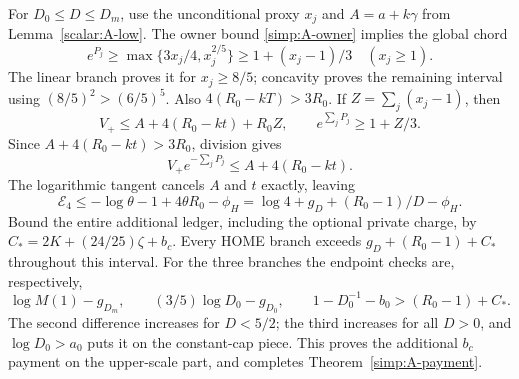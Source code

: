 For $D_0\le D\le D_m$, use the unconditional proxy
$x_j$ and $A=a+k\gamma$ from Lemma~\ref{scalar:A-low}.
The owner bound \eqref{simp:A-owner} implies the global chord
\[
 e^{P_j}\ge\max\{3x_j/4,x_j^{2/5}\}
                    \ge1+(x_j-1)/3\quad(x_j\ge1).
\]
The linear branch proves it for $x_j\ge8/5$; concavity proves the
remaining interval using $(8/5)^2>(6/5)^5$.
Also $4(R_0-kT)>3R_0$.  If $Z=\sum_j(x_j-1)$, then
\[
 V_+\le A+4(R_0-kt)+R_0Z,
 \qquad e^{\sum_jP_j}\ge1+Z/3.
\]
Since $A+4(R_0-kt)>3R_0$, division gives
\[
                    V_+e^{-\sum_jP_j}\le A+4(R_0-kt).
\]
The logarithmic tangent cancels $A$ and $t$ exactly, leaving
\[
 \mathcal E_4\le-\log\theta-1+4\theta R_0-\phi_H
 =\log4+g_D+(R_0-1)/D-\phi_H.
\]
Bound the entire additional ledger, including the optional private
charge, by $C_*=2K+(24/25)\zeta+b_c$.
Every HOME branch exceeds $g_D+(R_0-1)+C_*$ throughout this interval.
For the three branches the endpoint checks are, respectively,
\[
 \log M(1)-g_{D_m},\qquad
 (3/5)\log D_0-g_{D_0},\qquad
 1-D_0^{-1}-b_0
 >(R_0-1)+C_*.
\]
The second difference increases for $D<5/2$; the third increases
for all $D>0$, and $\log D_0>a_0$ puts it on the constant-cap piece.
This proves the additional $b_c$ payment on the upper-scale part,
and completes Theorem~\ref{simp:A-payment}.
